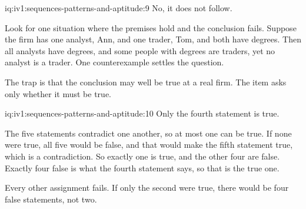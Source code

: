 \begin{solution}{iq:iv1:sequences-patterns-and-aptitude:9}
No, it does not follow.

Look for one situation where the premises hold and the conclusion fails. Suppose the firm has one analyst, Ann, and one trader, Tom, and both have degrees. Then all analysts have degrees, and some people with degrees are traders, yet no analyst is a trader. One counterexample settles the question.

The trap is that the conclusion may well be true at a real firm. The item asks only whether it must be true.

\end{solution}

\begin{solution}{iq:iv1:sequences-patterns-and-aptitude:10}
Only the fourth statement is true.

The five statements contradict one another, so at most one can be true. If none were true, all five would be false, and that would make the fifth statement true, which is a contradiction. So exactly one is true, and the other four are false. Exactly four false is what the fourth statement says, so that is the true one.

Every other assignment fails. If only the second were true, there would be four false statements, not two.

\end{solution}

